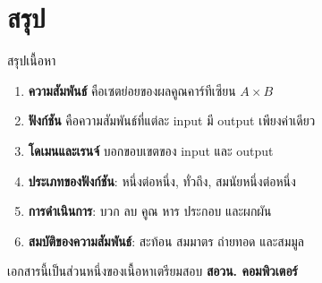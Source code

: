 \documentclass[11pt, aspectratio=169]{beamer}
\begin{document}
\section{สรุป}

\begin{frame}{สรุปเนื้อหา}
  \begin{explanation}[สิ่งที่ได้เรียนรู้]
    \begin{enumerate}
      \item \textbf{ความสัมพันธ์} คือเซตย่อยของผลคูณคาร์ทีเซียน $A \times B$
      \item \textbf{ฟังก์ชัน} คือความสัมพันธ์ที่แต่ละ input มี output เพียงค่าเดียว
      \item \textbf{โดเมนและเรนจ์} บอกขอบเขตของ input และ output
      \item \textbf{ประเภทของฟังก์ชัน}: หนึ่งต่อหนึ่ง, ทั่วถึง, สมนัยหนึ่งต่อหนึ่ง
      \item \textbf{การดำเนินการ}: บวก ลบ คูณ หาร ประกอบ และผกผัน
      \item \textbf{สมบัติของความสัมพันธ์}: สะท้อน สมมาตร ถ่ายทอด และสมมูล
    \end{enumerate}
  \end{explanation}

  \begin{center}
    \large เอกสารนี้เป็นส่วนหนึ่งของเนื้อหาเตรียมสอบ \textbf{สอวน. คอมพิวเตอร์}
  \end{center}
\end{frame}
\end{document}
